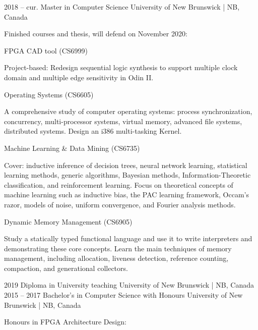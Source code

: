 \documentclass{developercv} %
\begin{document}



\begin{entrylist}

	\entry
	{2018 -- cur.}
	{Master in Computer Science}
	{University of New Brunswick | NB, Canada}
	{Finished courses and thesis, will defend on November 2020:

		\textbullet{} FPGA CAD tool (CS6999)
		\begin{smallQuote}
			Project-based: Redesign sequential logic synthesis to support multiple clock domain and multiple edge sensitivity in Odin II.
		\end{smallQuote}

		\textbullet{} Operating Systems (CS6605)
		\begin{smallQuote}
			A comprehensive study of computer operating systems: process synchronization, concurrency, multi-processor systems, virtual memory, advanced file systems, distributed systems.
			Design an i386 multi-tasking Kernel.
		\end{smallQuote}

		\textbullet{} Machine Learning \& Data Mining (CS6735)
		\begin{smallQuote}
			Cover: inductive inference of decision trees, neural network learning, statistical learning methods, generic algorithms, Bayesian methods, Information-Theoretic classification, and reinforcement learning.
			Focus on theoretical concepts of machine learning such as inductive bias, the PAC learning framework, Occam's razor, models of noise, uniform convergence, and Fourier analysis methods.
		\end{smallQuote}

		\textbullet{} Dynamic Memory Management (CS6905)
		\begin{smallQuote}
			Study a statically typed functional language and use it to write interpreters and demonstrating these core concepts.
			Learn the main techniques of memory management, including allocation, liveness detection, reference counting, compaction, and generational collectors.
		\end{smallQuote}
	}

	\shortentry
	{2019}
	{Diploma in University teaching}
	{University of New Brunswick | NB, Canada}\\

	\entry
	{2015 -- 2017}
	{Bachelor's in Computer Science with Honours}
	{University of New Brunswick | NB, Canada}
	{Honours in FPGA Architecture Design:

}
\end{entrylist}
\end{document}
